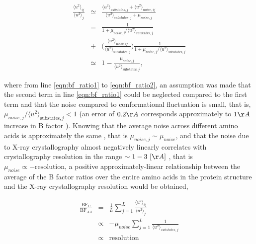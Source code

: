 \documentclass[11pt]{article}
\begin{document}
\begin{appendices}
    \begin{eqnarray}
        \label{eqn:bf_ratio}
        \frac{\langle u^2 \rangle_{ij}}{\langle u^2 \rangle_{j}} &\simeq& \frac{\langle u^2 \rangle_{substates,j} + \langle u^2 \rangle_{noise,ij}}{\langle u^2 \rangle_{substates,j} + \mu_{noise,j}} \\
                                 &=& \frac{1}{1 + \mu_{noise,j} / \langle u^2 \rangle_{\text{substates},j}} \nonumber \\
                                 &+& \bigg(\frac{\langle u^2 \rangle_{\text{noise},ij}}{\langle u^2 \rangle_{\text{substates},j}} \bigg)
                                 \frac{1}{1 + \mu_{noise,j} / \langle u^2 \rangle_{\text{substates},j}} \label{eqn:bf_ratio1} \\
                                 &\simeq& 1 - \frac{\mu_{noise,j}}{\langle u^2 \rangle_{\text{substates},j}}, \label{eqn:bf_ratio2}
    \end {eqnarray}

    \noindent where from line \ref{eqn:bf_ratio1} to \ref{eqn:bf_ratio2}, an assumption was made that the second term in line \ref{eqn:bf_ratio1} could be neglected compared to the first term and that the noise compared to conformational fluctuation is small, that is, $\mu_{noise,j} / \langle u^2 \rangle_{\text{substates},j} < 1$ (an error of $0.2\AA$ corresponds approximately to $1\AA$ increase in B factor \cite{read_structure-factor_1990}). Knowing that the average noise across different amino acids is approximately the same \cite{frauenfelder_temperature-dependent_1979}, that is $\mu_{noise,j}\sim \mu_{noise}$, and that the noise due to X-ray crystallography almost negatively linearly correlates with crystallography resolution in the range $\sim1-3~[\AA]$ \cite{read_structure-factor_1990}, that is $\mu_{noise}\propto -\text{resolution}$, a positive approximately-linear relationship between the average of the B factor ratios over the entire amino acids in the protein structure and the X-ray crystallography resolution would be obtained,

    \begin{eqnarray}
        \frac{\text{BF}_C}{\text{BF}_{AA}} &=& \frac{1}{L}\sum_{j=1}^{L}\frac{\langle u^2 \rangle_{ij}}{\langle u^2 \rangle_{j}} \label{eqn:avg_bf_ratio} \\
                                           &\propto& -\mu_{noise} \sum_{j=1}^{L}\frac{1}{\langle u^2 \rangle_{substates,j}} \label{eqn:avg_bf_ratio1} \\
                                           &\propto& \text{resolution}
    \end {eqnarray}


\end{appendices}
\end{document}
